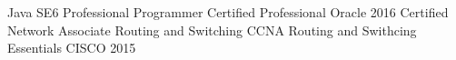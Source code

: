 \begin{cvhonors}
  \cvhonor
    {Java SE6 Professional Programmer}
    {Certified Professional}
    {Oracle}
    {2016}
  \cvhonor
    {Certified Network Associate Routing and Switching }
    {CCNA Routing and Swithcing Essentials}
    {CISCO}
    {2015}
\end{cvhonors}
